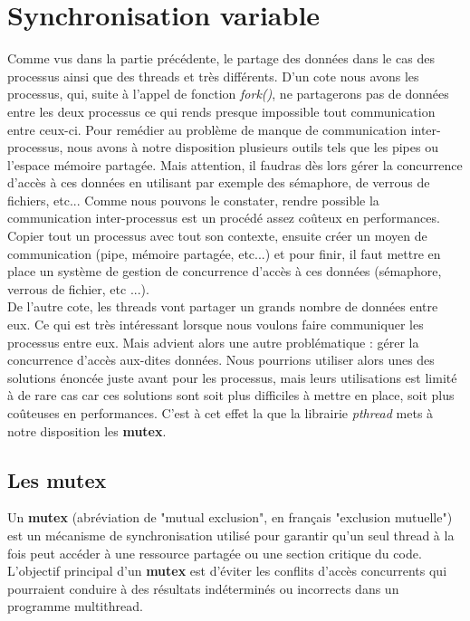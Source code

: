\section{Synchronisation variable}

Comme vus dans la partie précédente, le partage des données dans le cas des processus ainsi que des threads et très différents. D'un cote nous avons les processus, qui, suite à l'appel de fonction \textit{fork()}, ne partagerons pas de données entre les deux processus ce qui rends presque impossible tout communication entre ceux-ci. Pour remédier au problème de manque de communication inter-processus, nous avons à notre disposition plusieurs outils tels que les pipes ou l'espace mémoire partagée. Mais attention, il faudras dès lors gérer la concurrence d'accès à ces données en utilisant par exemple des sémaphore, de verrous de fichiers, etc... Comme nous pouvons le constater, rendre possible la communication inter-processus est un procédé assez coûteux en performances. Copier tout un processus avec tout son contexte, ensuite créer un moyen de communication (pipe, mémoire partagée, etc...) et pour finir, il faut mettre en place un système de gestion de concurrence d'accès à ces données (sémaphore, verrous de fichier, etc ...).
\\

De l'autre cote, les threads vont partager un grands nombre de données entre eux. Ce qui est très intéressant lorsque nous voulons faire communiquer les processus entre eux. Mais advient alors une autre problématique : gérer la concurrence d'accès aux-dites données. Nous pourrions utiliser alors unes des solutions énoncée juste avant pour les processus, mais leurs utilisations est limité à de rare cas car ces solutions sont soit plus difficiles à mettre en place, soit plus coûteuses en performances. C'est à cet effet la que la librairie \textit{pthread} mets à notre disposition les \textbf{mutex}.

\subsection{Les mutex}
Un \textbf{mutex} (abréviation de "mutual exclusion", en français "exclusion mutuelle") est un mécanisme de synchronisation utilisé pour garantir qu'un seul thread à la fois peut accéder à une ressource partagée ou une section critique du code. L'objectif principal d'un \textbf{mutex} est d'éviter les conflits d'accès concurrents qui pourraient conduire à des résultats indéterminés ou incorrects dans un programme multithread.

